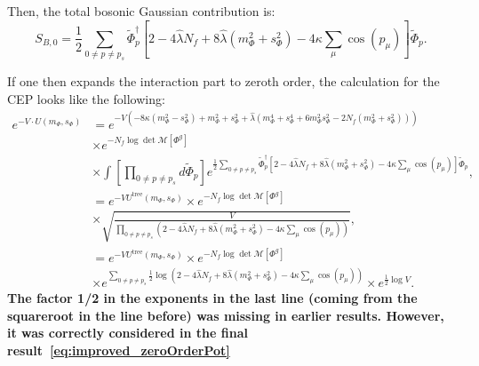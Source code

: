 Then, the total bosonic Gaussian contribution is:
\begin{equation}\label{eq:CEP_alternative_bosonic_Gaussian_contribution}
 S_{B,0} = \frac{1}{2}  \sum\limits_{0\neq p \neq p_s}  \tilde\Phi_p^{\dagger}  
              \left[ 2 - 4 \hat\lambda N_f + 8 \hat\lambda \left( m_{\Phi}^2 + s_{\Phi}^2  \right) - 4 \kappa \sum_{\mu} \cos(p_{\mu}) \right]  \tilde\Phi_p.
\end{equation}

If one then expands the interaction part to zeroth order, the calculation for the CEP looks like the following:
\begin{align}\label{eq:deriv_of_bosDet_step1}
 e^{-V\cdot U(m_{\Phi}, s_{\Phi})} &= 
           e^{-V\left(
             -8 \kappa \left( m_{\Phi}^2 - s_{\Phi}^2 \right)  +  m_{\Phi}^2 + s_{\Phi}^2 
             + \hat\lambda \left( m_{\Phi}^4 + s_{\Phi}^4 + 6 m_{\Phi}^2s_{\Phi}^2 - 2 N_f \left(m_{\Phi}^2 + s_{\Phi}^2\right) \right) \right)} 
             \nonumber \\
             &\times e^{-N_f \log \det \mathcal{M}[\Phi^g]} 
             \nonumber \\
             &\times \int \left[\prod\limits_{0 \neq p \neq p_s}  d \tilde \Phi_p \right] 
              e^{ \frac{1}{2}  \sum\limits_{0\neq p \neq p_s}  \tilde\Phi_p^{\dagger}  
              \left[ 2 - 4 \hat\lambda N_f + 8 \hat\lambda \left( m_{\Phi}^2 + s_{\Phi}^2  \right) - 4 \kappa \sum_{\mu} \cos(p_{\mu}) \right]  \tilde\Phi_p}, 
          \\ \label{eq:deriv_of_bosDet_step2}
          &= e^{-V U^{\text{tree}}(m_{\Phi}, s_{\Phi})} \times e^{-N_f \log \det \mathcal{M}[\Phi^g]} 
          \nonumber \\
          & \times \sqrt{\frac{V}{\prod\limits_{0 \neq p \neq p_s} 
             \left(  2 - 4 \hat\lambda N_f + 8 \hat\lambda \left( m_{\Phi}^2 + s_{\Phi}^2  \right) - 4 \kappa \sum_{\mu} \cos(p_{\mu}) \right) }} ,
             \\\label{eq:deriv_of_bosDet_step3}
          &=  e^{-V U^{\text{tree}}(m_{\Phi}, s_{\Phi})} \times e^{-N_f \log \det \mathcal{M}[\Phi^g]} 
            \nonumber \\
          & \times e^{\sum\limits_{0 \neq p \neq p_s} 
          \frac{1}{2}\log\left( 2 - 4 \hat\lambda N_f + 8 \hat\lambda \left( m_{\Phi}^2 + s_{\Phi}^2  \right) - 4 \kappa \sum_{\mu} \cos(p_{\mu}) \right)}
            \times e^{\frac{1}{2}\log V}.
\end{align}
\textbf{The factor 1/2 in the exponents in the last line (coming from the squareroot in the line before) was missing in earlier results. However, it was correctly 
considered in the final result~\eqref{eq:improved_zeroOrderPot}}\\

